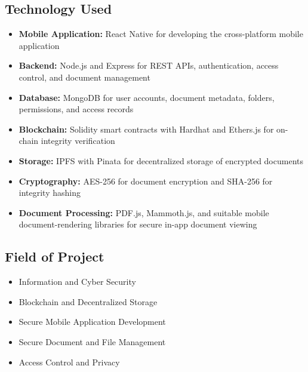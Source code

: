 \documentclass[12pt]{article}
\begin{document}
\subsection{Technology Used}
\begin{itemize}
\item \textbf{Mobile Application:} React Native for developing the cross-platform mobile application
\item \textbf{Backend:} Node.js and Express for REST APIs, authentication, access control, and document management
\item \textbf{Database:} MongoDB for user accounts, document metadata, folders, permissions, and access records
\item \textbf{Blockchain:} Solidity smart contracts with Hardhat and Ethers.js for on-chain integrity verification
\item \textbf{Storage:} IPFS with Pinata for decentralized storage of encrypted documents
\item \textbf{Cryptography:} AES-256 for document encryption and SHA-256 for integrity hashing \cite{nist197}
\item \textbf{Document Processing:} PDF.js, Mammoth.js, and suitable mobile document-rendering libraries for secure in-app document viewing
\end{itemize}

\subsection{Field of Project}
\begin{itemize}
\item Information and Cyber Security
\item Blockchain and Decentralized Storage
\item Secure Mobile Application Development
\item Secure Document and File Management
\item Access Control and Privacy
\end{itemize}
\end{document}
